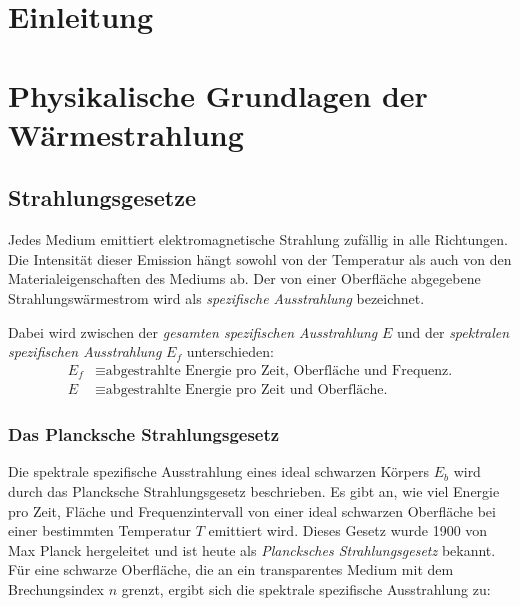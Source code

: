 \documentclass[12pt,a4paper]{article}
\begin{document}



\setcounter{page}{2}
\tableofcontents
\newpage




\section{Einleitung}

\section{Physikalische Grundlagen der Wärmestrahlung}

\subsection{Strahlungsgesetze}
Jedes Medium emittiert elektromagnetische Strahlung zufällig in alle Richtungen. 
Die Intensität dieser Emission hängt sowohl von der Temperatur als auch von den Materialeigenschaften des Mediums ab. 
Der von einer Oberfläche abgegebene Strahlungswärmestrom wird als \textit{spezifische Ausstrahlung} bezeichnet.

Dabei wird zwischen der \textit{gesamten spezifischen Ausstrahlung} $E$ und der \textit{spektralen spezifischen Ausstrahlung} $E_f$ unterschieden:
\begin{align*}
E_f &\equiv \text{abgestrahlte Energie pro Zeit, Oberfläche und Frequenz.} \\
E &\equiv \text{abgestrahlte Energie pro Zeit und Oberfläche.}
\end{align*}
\cite[S.~6--7]{radiativeHeatTransfer}


\subsubsection{Das Plancksche Strahlungsgesetz}

Die spektrale spezifische Ausstrahlung eines ideal schwarzen Körpers $E_b$ wird durch das Plancksche Strahlungsgesetz beschrieben. 
Es gibt an, wie viel Energie pro Zeit, Fläche und Frequenzintervall von einer ideal schwarzen Oberfläche bei einer bestimmten Temperatur $T$ emittiert wird. 
Dieses Gesetz wurde 1900 von Max Planck \cite{plancknormalspektrum} hergeleitet und ist heute als \textit{Plancksches Strahlungsgesetz} bekannt. 
Für eine schwarze Oberfläche, die an ein transparentes Medium mit dem Brechungsindex $n$ grenzt, ergibt sich die spektrale spezifische Ausstrahlung\cite[S.7]{radiativeHeatTransfer} zu:
\end{document}
